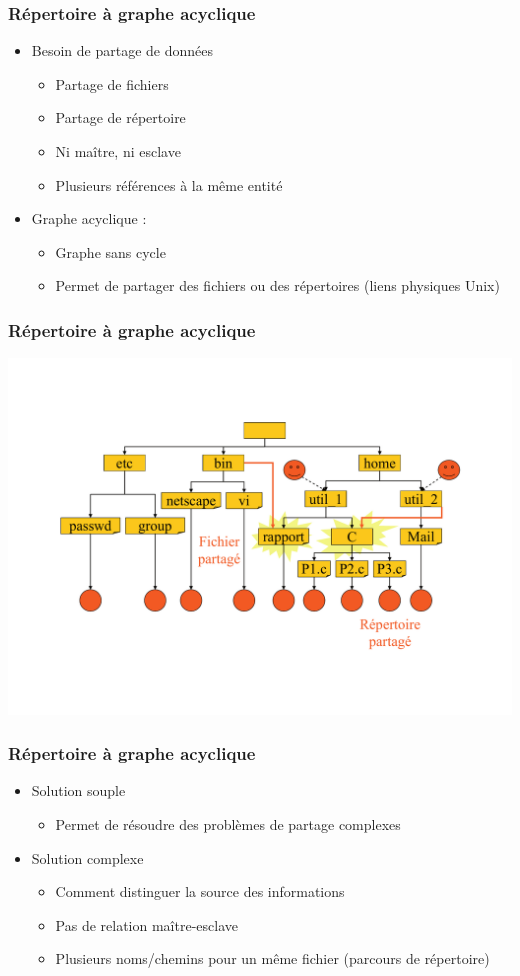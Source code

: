 \begin{frame}
\frametitle{Répertoire à graphe acyclique}
\begin{itemize}
\item Besoin de partage de données
\begin{itemize}
\item Partage de fichiers
\item Partage de répertoire
\item Ni maître, ni esclave
\item Plusieurs références à la même entité
\end{itemize}
\item Graphe acyclique :
\begin{itemize}
\item Graphe sans cycle
\item Permet de partager des fichiers ou des répertoires (liens physiques Unix)
\end{itemize}
\end{itemize}
\end{frame}

\begin{frame}
\frametitle{Répertoire à graphe acyclique}
\includegraphics[width=.9\textwidth]{../illustration/repertoire_graphe.pdf}
\end{frame}

\begin{frame}
\frametitle{Répertoire à graphe acyclique}
\begin{itemize}
\item Solution souple
\begin{itemize}
\item Permet de résoudre des problèmes de partage complexes
\end{itemize}
\item Solution complexe
\begin{itemize}
\item Comment distinguer la source des informations
\item Pas de relation maître-esclave
\item Plusieurs noms/chemins pour un même fichier (parcours de répertoire)
\end{itemize}
\end{itemize}
\end{frame}

